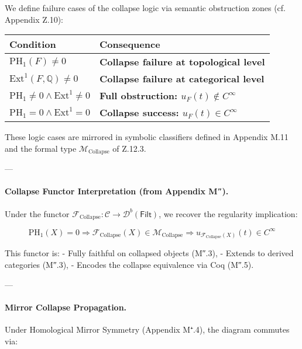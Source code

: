 \documentclass[11pt]{article}
\begin{document}
\begin{axiom}
\begin{axiom}
{{We define failure cases of the collapse logic via semantic obstruction zones (cf. Appendix Z.10):

\begin{center}
\renewcommand{\arraystretch}{1.6}
\begin{tabularx}{\textwidth}{|>{\centering\arraybackslash}X|>{\centering\arraybackslash}X|}
\hline
\textbf{Condition} & \textbf{Consequence} \\
\hline
$\mathrm{PH}_1(F) \neq 0$ & \textbf{Collapse failure at topological level} \\
\hline
$\mathrm{Ext}^1(F, \mathbb{Q}) \neq 0$ & \textbf{Collapse failure at categorical level} \\
\hline
$\mathrm{PH}_1 \neq 0 \land \mathrm{Ext}^1 \neq 0$ & \textbf{Full obstruction: $u_F(t) \notin C^\infty$} \\
\hline
$\mathrm{PH}_1 = 0 \land \mathrm{Ext}^1 = 0$ & \textbf{Collapse success: $u_F(t) \in C^\infty$} \\
\hline
\end{tabularx}
\end{center}

These logic cases are mirrored in symbolic classifiers defined in Appendix M.11  
and the formal type $\mathcal{M}_{\text{Collapse}}$ of Z.12.3.

---

\paragraph{Collapse Functor Interpretation (from Appendix M″).}

Under the functor \( \mathcal{F}_{\text{Collapse}} : \mathcal{C} \to \mathcal{D}^b(\mathsf{Filt}) \),  
we recover the regularity implication:

\[
\mathrm{PH}_1(X) = 0 \Rightarrow \mathcal{F}_{\text{Collapse}}(X) \in \mathcal{M}_{\text{Collapse}}  
\Rightarrow u_{\mathcal{F}_{\text{Collapse}}(X)}(t) \in C^\infty
\]

This functor is:
- Fully faithful on collapsed objects (M″.3),
- Extends to derived categories (M″.3),
- Encodes the collapse equivalence via Coq (M″.5).

---

\paragraph{Mirror Collapse Propagation.}

Under Homological Mirror Symmetry (Appendix M⁺.4), the diagram commutes via:

}}
\end{axiom}
\end{axiom}
\end{document}
